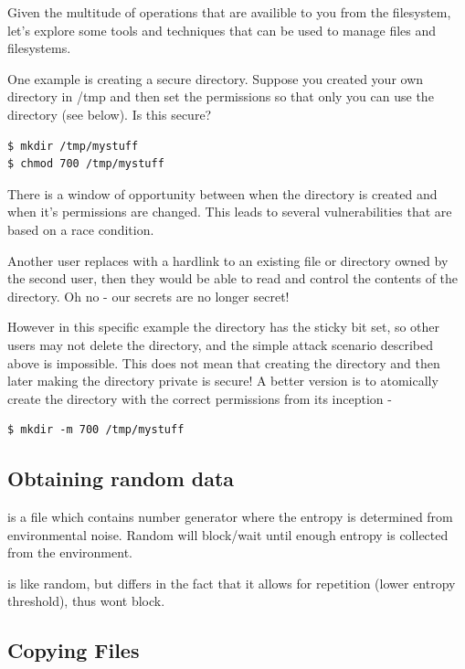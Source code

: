 Given the multitude of operations that are availible to you from the filesystem, let's explore some tools and techniques that can be used to manage files and filesystems. 

One example is creating a secure directory. Suppose you created your own directory in /tmp and then set the permissions so that only you can use the directory (see below). Is this secure?

\begin{lstlisting}
$ mkdir /tmp/mystuff
$ chmod 700 /tmp/mystuff
\end{lstlisting}

There is a window of opportunity between when the directory is created and when it's permissions are changed. This leads to several vulnerabilities that are based on a race condition.

Another user replaces  with a hardlink to an existing file or directory owned by the second user, then they would be able to read and control the contents of the  directory. Oh no - our secrets are no longer secret!

However in this specific example the  directory has the sticky bit set, so other users may not delete the  directory, and the simple attack scenario described above is impossible. This does not mean that creating the directory and then later making the directory private is secure! A better version is to atomically create the directory with the correct permissions from its inception -

\begin{lstlisting}
$ mkdir -m 700 /tmp/mystuff
\end{lstlisting}

\subsection{Obtaining random data}

 is a file which contains number generator where the entropy is determined from environmental noise. Random will block/wait until enough entropy is collected from the environment.

 is like random, but differs in the fact that it allows for repetition (lower entropy threshold), thus wont block.


\subsection{Copying Files}

